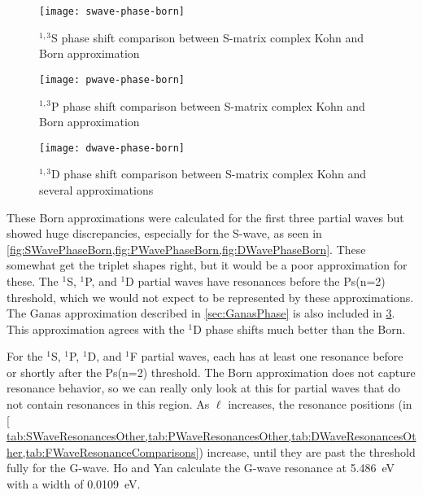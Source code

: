 \documentclass[Dissertation.tex]{subfiles}
\begin{document}
\begin{figure}[H]
	\centering
	\texttt{[image: swave-phase-born]}
	\caption[$^{1,3}$S complex Kohn and Born comparison]{$^{1,3}$S phase shift comparison between S-matrix complex Kohn and Born approximation}
	\label{fig:SWavePhaseBorn}
\end{figure}

\begin{figure}[H]
	\centering
	\texttt{[image: pwave-phase-born]}
	\caption[$^{1,3}$P complex Kohn and Born comparison]{$^{1,3}$P phase shift comparison between S-matrix complex Kohn and Born approximation}
	\label{fig:PWavePhaseBorn}
\end{figure}

\begin{figure}[H]
	\centering
	\texttt{[image: dwave-phase-born]}
	\caption[$^{1,3}$D complex Kohn and Born comparison]{$^{1,3}$D phase shift comparison between S-matrix complex Kohn and several approximations}
	\label{fig:DWavePhaseBorn}
\end{figure}


These Born approximations were calculated for the first three partial waves 
but showed huge discrepancies, especially for the S-wave, as seen in
\cref{fig:SWavePhaseBorn,fig:PWavePhaseBorn,fig:DWavePhaseBorn}. These somewhat get 
the triplet shapes right, but it would be a poor approximation for these. The 
$^1$S, $^1$P, and $^1$D partial waves have resonances before the Ps(n=2)
threshold, which we would not expect to be represented by these approximations.
The Ganas approximation described in \cref{sec:GanasPhase} is also included in
\cref{fig:DWavePhaseBorn}. This approximation agrees with the $^1$D phase
shifts much better than the Born.

For the $^1$S, $^1$P, $^1$D, and $^1$F partial waves, each has at least one 
resonance before or shortly after the Ps(n=2) threshold. The Born 
approximation does not capture resonance behavior, so we can really only look 
at this for partial waves that do not contain resonances in this region. As
$\ell$ increases, the resonance positions
(in \cref{ tab:SWaveResonancesOther,tab:PWaveResonancesOther,tab:DWaveResonancesOther,tab:FWaveResonanceComparisons})
increase, until they are past the threshold fully for the G-wave.
Ho and Yan \cite{Ho2000} calculate the G-wave resonance
at \SI{5.486}{eV} with a width of \SI{0.0109}{eV}.
\end{document}
